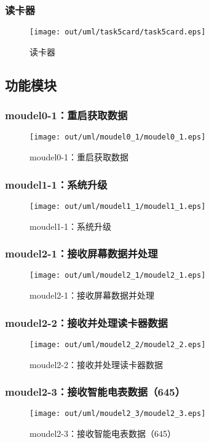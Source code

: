 \subsubsection{读卡器}
\begin{figure}[H]
  \centering
  \texttt{[image: out/uml/task5card/task5card.eps]}
  \caption{读卡器}
\end{figure}

\subsection{功能模块}

\subsubsection{moudel0-1：重启获取数据}
\begin{figure}[H]
  \centering
  \texttt{[image: out/uml/moudel0\_1/moudel0\_1.eps]}
  \caption{moudel0-1：重启获取数据}
\end{figure}

\subsubsection{moudel1-1：系统升级}
\begin{figure}[H]
  \centering
  \texttt{[image: out/uml/moudel1\_1/moudel1\_1.eps]}
  \caption{moudel1-1：系统升级}
\end{figure}


\subsubsection{moudel2-1：接收屏幕数据并处理}
\begin{figure}[H]
  \centering
  \texttt{[image: out/uml/moudel2\_1/moudel2\_1.eps]}
  \caption{moudel2-1：接收屏幕数据并处理}
\end{figure}

\subsubsection{moudel2-2：接收并处理读卡器数据}
\begin{figure}[H]
  \centering
  \texttt{[image: out/uml/moudel2\_2/moudel2\_2.eps]}
  \caption{moudel2-2：接收并处理读卡器数据}
\end{figure}

\subsubsection{moudel2-3：接收智能电表数据（645）}
\begin{figure}[H]
  \centering
  \texttt{[image: out/uml/moudel2\_3/moudel2\_3.eps]}
  \caption{moudel2-3：接收智能电表数据（645）}
\end{figure}

